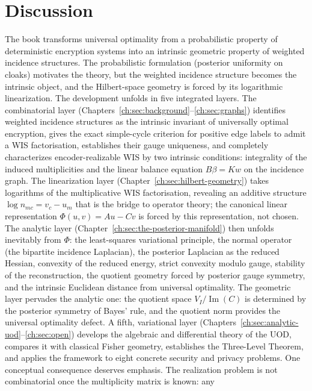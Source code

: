 \chapter[Discussion]{Discussion}\label{ch:sec:discussion}
The book transforms universal optimality from a probabilistic property
of deterministic encryption systems into an intrinsic geometric
property of weighted incidence structures.  The probabilistic
formulation (posterior uniformity on cloaks) motivates the theory, but
the weighted incidence structure becomes the intrinsic object, and the
Hilbert-space geometry is forced by its logarithmic linearization.
The development unfolds in five integrated layers.  The combinatorial
layer (Chapters~\ref{ch:sec:background}--\ref{ch:sec:graphs}) identifies weighted incidence structures as the
intrinsic invariant of universally optimal encryption, gives the exact
simple-cycle criterion for positive edge labels to admit a WIS
factorisation, establishes their gauge uniqueness, and completely
characterizes encoder-realizable
WIS by two intrinsic conditions: integrality of the induced
multiplicities and the linear balance equation $B\beta = K w$ on the
incidence graph.  The linearization layer (Chapter~\ref{ch:sec:hilbert-geometry}) takes logarithms
of the multiplicative WIS factorisation, revealing an additive
structure $\log n_{mc}=v_c-u_m$ that is the bridge to operator theory;
the canonical linear representation $\Phi(u,v)=Au-Cv$ is forced by this
representation, not chosen.  The analytic layer (Chapter~\ref{ch:sec:the-posterior-manifold}) then
unfolds inevitably from $\Phi$: the least-squares variational principle,
the normal operator (the bipartite incidence Laplacian), the posterior
Laplacian as the reduced Hessian, convexity of the reduced energy,
strict convexity modulo gauge, stability of the reconstruction, the
quotient geometry forced by posterior gauge symmetry, and the intrinsic
Euclidean distance from universal optimality.  The geometric layer pervades
the analytic one: the quotient space $V_I/\operatorname{Im}(C)$ is
determined by the posterior symmetry of Bayes' rule, and the quotient
norm provides the universal optimality defect.
A fifth, variational layer (Chapters~\ref{ch:sec:analytic-uod}--\ref{ch:sec:open}) develops the algebraic and
differential theory of the UOD, compares it with classical Fisher
geometry, establishes the Three-Level Theorem, and applies the
framework to eight concrete security and privacy problems.
One conceptual consequence deserves emphasis.  The realization problem
is not combinatorial once the multiplicity matrix is known: any
